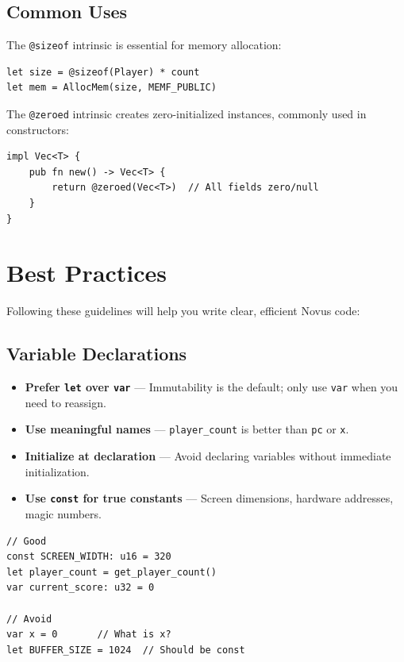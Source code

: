 \subsection{Common Uses}

The \texttt{@sizeof} intrinsic is essential for memory allocation:

\begin{lstlisting}
let size = @sizeof(Player) * count
let mem = AllocMem(size, MEMF_PUBLIC)
\end{lstlisting}

The \texttt{@zeroed} intrinsic creates zero-initialized instances, commonly used in constructors:

\begin{lstlisting}
impl Vec<T> {
    pub fn new() -> Vec<T> {
        return @zeroed(Vec<T>)  // All fields zero/null
    }
}
\end{lstlisting}

\section{Best Practices}

Following these guidelines will help you write clear, efficient Novus code:

\subsection{Variable Declarations}

\begin{itemize}
    \item \textbf{Prefer \texttt{let} over \texttt{var}} --- Immutability is the default; only use \texttt{var} when you need to reassign.
    \item \textbf{Use meaningful names} --- \texttt{player\_count} is better than \texttt{pc} or \texttt{x}.
    \item \textbf{Initialize at declaration} --- Avoid declaring variables without immediate initialization.
    \item \textbf{Use \texttt{const} for true constants} --- Screen dimensions, hardware addresses, magic numbers.
\end{itemize}

\begin{lstlisting}
// Good
const SCREEN_WIDTH: u16 = 320
let player_count = get_player_count()
var current_score: u32 = 0

// Avoid
var x = 0       // What is x?
let BUFFER_SIZE = 1024  // Should be const
\end{lstlisting}

